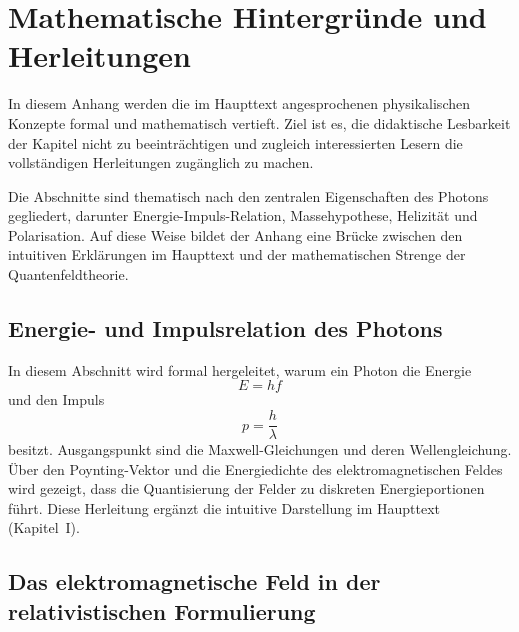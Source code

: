

\appendix
\renewcommand{\thechapter}{A}

\renewcommand{\thesection}{\Alph{chapter}.\arabic{section}}

\chapter{Mathematische Hintergründe und Herleitungen}
\label{anhangA}

In diesem Anhang werden die im Haupttext angesprochenen physikalischen Konzepte
formal und mathematisch vertieft. Ziel ist es, die didaktische Lesbarkeit der
Kapitel nicht zu beeinträchtigen und zugleich interessierten Lesern die
vollständigen Herleitungen zugänglich zu machen. 

Die Abschnitte sind thematisch nach den zentralen Eigenschaften des Photons
gegliedert, darunter Energie-Impuls-Relation, Massehypothese, Helizität und
Polarisation. Auf diese Weise bildet der Anhang eine Brücke zwischen den
intuitiven Erklärungen im Haupttext und der mathematischen Strenge der
Quantenfeldtheorie.

\section{Energie- und Impulsrelation des Photons}
\label{anhangA:energie_impuls}

In diesem Abschnitt wird formal hergeleitet, warum ein Photon die Energie
\[
E = h f
\]
und den Impuls
\[
p = \frac{h}{\lambda}
\]
besitzt. Ausgangspunkt sind die Maxwell-Gleichungen und deren Wellengleichung.
Über den Poynting-Vektor und die Energiedichte des elektromagnetischen Feldes
wird gezeigt, dass die Quantisierung der Felder zu diskreten Energieportionen
führt. Diese Herleitung ergänzt die intuitive Darstellung im Haupttext
(Kapitel~I).

\section{Das elektromagnetische Feld in der relativistischen Formulierung}
\label{anhangA:feldtheorie}

